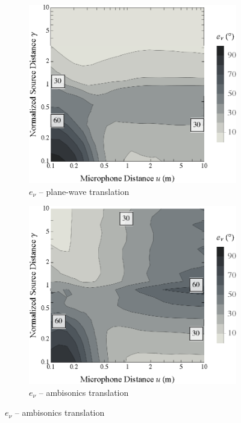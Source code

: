 \begin{figure}[tbp]
    	\centering
    	\begin{subfigure}[b]{0.49\textwidth}
        		\includegraphics[width=\textwidth]{07_characterization_extrapolation/figures/tylka2017_contour_pwt.eps}
        		\caption{$e_\nu$ -- plane-wave translation}
        		\label{fig:07_Characterization_Extrapolation:Localization_Errors:PWT}
    	\end{subfigure}
	\hfill
    	\begin{subfigure}[b]{0.49\textwidth}
        		\includegraphics[width=\textwidth]{07_characterization_extrapolation/figures/tylka2017_contour_sre.eps}
        		\caption{$e_\nu$ -- ambisonics translation}
        		\label{fig:07_Characterization_Extrapolation:Localization_Errors:SRE}
    	\end{subfigure}
	

\end{figure}
